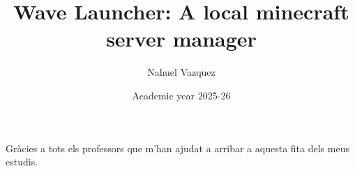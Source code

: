 \documentclass[]{TFGEPSUIB}
\title{Wave Launcher: A local minecraft server manager}
\author{Nahuel Vazquez}
\date{Academic year 2025-26}
\begin{document}
\portada
\portadainterior
\frontmatter

%
\cleartorecto \thispagestyle{empty}
\begin{agraiments}
    Gràcies a tots els professors que m'han ajudat a arribar a aquesta fita dels meus estudis.
\end{agraiments}

\cleartorecto \tableofcontents






\mainmatter\pagestyle{ruled}






%





\appendix




\backmatter




\end{document}
